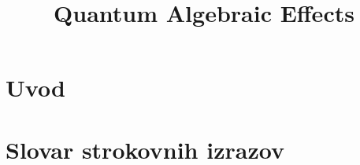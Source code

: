 \documentclass[mat1]{fmfdelo}
\title{Quantum Algebraic Effects}
\begin{document}
\section{Uvod}

\section*{Slovar strokovnih izrazov}

\geslo{}{}
\geslo{}{}

\begin{thebibliography}{99}


\end{thebibliography}
\end{document}
